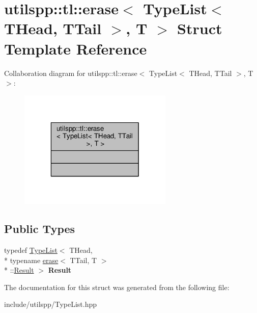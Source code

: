 \hypertarget{structutilspp_1_1tl_1_1erase_3_01TypeList_3_01THead_00_01TTail_01_4_00_01T_01_4}{\section{utilspp\-:\-:tl\-:\-:erase$<$ Type\-List$<$ T\-Head, T\-Tail $>$, T $>$ Struct Template Reference}
\label{structutilspp_1_1tl_1_1erase_3_01TypeList_3_01THead_00_01TTail_01_4_00_01T_01_4}
}


Collaboration diagram for utilspp\-:\-:tl\-:\-:erase$<$ Type\-List$<$ T\-Head, T\-Tail $>$, T $>$\-:
\nopagebreak
\begin{figure}[H]
\begin{center}
\leavevmode
\includegraphics[width=208pt]{structutilspp_1_1tl_1_1erase_3_01TypeList_3_01THead_00_01TTail_01_4_00_01T_01_4__coll__graph}
\end{center}
\end{figure}
\subsection*{Public Types}
\begin{DoxyCompactItemize}
\item 
\hypertarget{structutilspp_1_1tl_1_1erase_3_01TypeList_3_01THead_00_01TTail_01_4_00_01T_01_4_a63196047031f70470bbb9419704f8563}{typedef \hyperlink{structutilspp_1_1tl_1_1TypeList}{Type\-List}$<$ T\-Head, \\*
typename \hyperlink{structutilspp_1_1tl_1_1erase}{erase}$<$ T\-Tail, T $>$\\*
\-::\hyperlink{structutilspp_1_1tl_1_1TypeList}{Result} $>$ {\bfseries Result}}\label{structutilspp_1_1tl_1_1erase_3_01TypeList_3_01THead_00_01TTail_01_4_00_01T_01_4_a63196047031f70470bbb9419704f8563}

\end{DoxyCompactItemize}


The documentation for this struct was generated from the following file\-:\begin{DoxyCompactItemize}
\item 
include/utilspp/Type\-List.\-hpp\end{DoxyCompactItemize}
